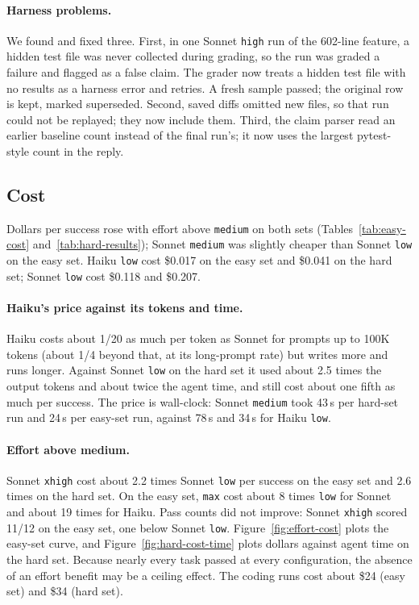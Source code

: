 \paragraph{Harness problems.} We found and fixed three. First, in one Sonnet \texttt{high} run of the 602-line feature, a hidden test file was never collected during grading, so the run was graded a failure and flagged as a false claim. The grader now treats a hidden test file with no results as a harness error and retries. A fresh sample passed; the original row is kept, marked superseded. Second, saved diffs omitted new files, so that run could not be replayed; they now include them. Third, the claim parser read an earlier baseline count instead of the final run's; it now uses the largest pytest-style count in the reply.

\subsection{Cost}\label{sec:exp-cost}

Dollars per success rose with effort above \texttt{medium} on both sets (Tables~\ref{tab:easy-cost} and~\ref{tab:hard-results}); Sonnet \texttt{medium} was slightly cheaper than Sonnet \texttt{low} on the easy set. Haiku \texttt{low} cost \$0.017 on the easy set and \$0.041 on the hard set; Sonnet \texttt{low} cost \$0.118 and \$0.207.

\paragraph{Haiku's price against its tokens and time.} Haiku costs about 1/20 as much per token as Sonnet for prompts up to 100K tokens (about 1/4 beyond that, at its long-prompt rate) but writes more and runs longer. Against Sonnet \texttt{low} on the hard set it used about 2.5 times the output tokens and about twice the agent time, and still cost about one fifth as much per success. The price is wall-clock: Sonnet \texttt{medium} took 43\,s per hard-set run and 24\,s per easy-set run, against 78\,s and 34\,s for Haiku \texttt{low}.

\paragraph{Effort above medium.} Sonnet \texttt{xhigh} cost about 2.2 times Sonnet \texttt{low} per success on the easy set and 2.6 times on the hard set. On the easy set, \texttt{max} cost about 8 times \texttt{low} for Sonnet and about 19 times for Haiku. Pass counts did not improve: Sonnet \texttt{xhigh} scored 11/12 on the easy set, one below Sonnet \texttt{low}. Figure~\ref{fig:effort-cost} plots the easy-set curve, and Figure~\ref{fig:hard-cost-time} plots dollars against agent time on the hard set. Because nearly every task passed at every configuration, the absence of an effort benefit may be a ceiling effect. The coding runs cost about \$24 (easy set) and \$34 (hard set).


